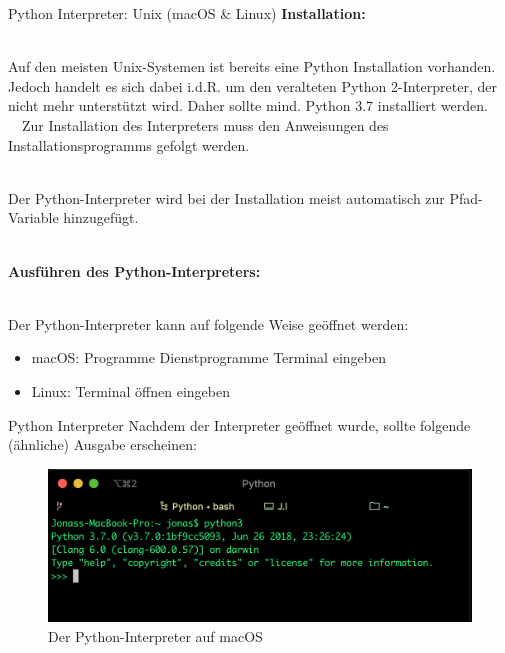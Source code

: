     \begin{frame}{Python Interpreter: Unix (macOS \& Linux)}
        \textbf{Installation:}\\~\
        
        Auf den meisten Unix-Systemen ist bereits eine Python Installation vorhanden. Jedoch handelt es sich dabei i.d.R. um den veralteten Python 2-Interpreter, der nicht mehr unterstützt wird. Daher sollte mind. Python 3.7 installiert werden. \\~\
        Zur Installation des Interpreters muss den Anweisungen des Installationsprogramms gefolgt werden.\\~\
        
        Der Python-Interpreter wird bei der Installation meist automatisch zur Pfad-Variable hinzugefügt. \\~\
        
        \textbf{Ausführen des Python-Interpreters:} \\~\
        
        Der Python-Interpreter kann auf folgende Weise geöffnet werden:
        \begin{itemize}
            \item macOS: Programme \textrightarrow Dienstprogramme \textrightarrow Terminal \textrightarrow {} eingeben
            \item Linux: Terminal öffnen \textrightarrow \code{python3} eingeben
        \end{itemize}
    \end{frame}
    
    \begin{frame}{Python Interpreter}
        Nachdem der Interpreter geöffnet wurde, sollte folgende (ähnliche) Ausgabe erscheinen:
        
        \begin{figure}
            \centering
            \includegraphics[width=0.8\linewidth,height=0.5\textheight,keepaspectratio]{chapters/06_python1_introduction/figures/interpreter.png}
            \caption{Der Python-Interpreter auf macOS}
        \end{figure}
    \end{frame}
    
